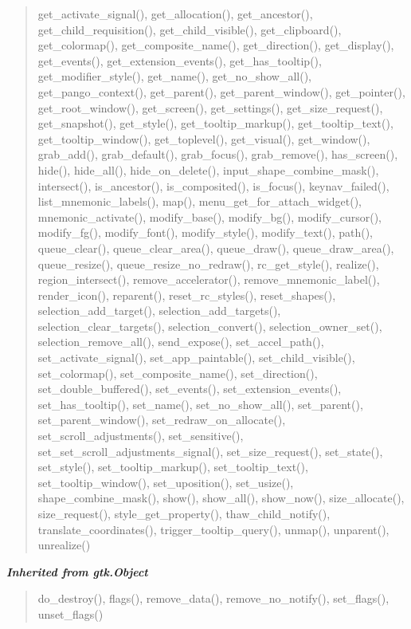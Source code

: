 \begin{quote}
get\_activate\_signal(), get\_allocation(), get\_ancestor(), get\_child\_requisition(), get\_child\_visible(), get\_clipboard(), get\_colormap(), get\_composite\_name(), get\_direction(), get\_display(), get\_events(), get\_extension\_events(), get\_has\_tooltip(), get\_modifier\_style(), get\_name(), get\_no\_show\_all(), get\_pango\_context(), get\_parent(), get\_parent\_window(), get\_pointer(), get\_root\_window(), get\_screen(), get\_settings(), get\_size\_request(), get\_snapshot(), get\_style(), get\_tooltip\_markup(), get\_tooltip\_text(), get\_tooltip\_window(), get\_toplevel(), get\_visual(), get\_window(), grab\_add(), grab\_default(), grab\_focus(), grab\_remove(), has\_screen(), hide(), hide\_all(), hide\_on\_delete(), input\_shape\_combine\_mask(), intersect(), is\_ancestor(), is\_composited(), is\_focus(), keynav\_failed(), list\_mnemonic\_labels(), map(), menu\_get\_for\_attach\_widget(), mnemonic\_activate(), modify\_base(), modify\_bg(), modify\_cursor(), modify\_fg(), modify\_font(), modify\_style(), modify\_text(), path(), queue\_clear(), queue\_clear\_area(), queue\_draw(), queue\_draw\_area(), queue\_resize(), queue\_resize\_no\_redraw(), rc\_get\_style(), realize(), region\_intersect(), remove\_accelerator(), remove\_mnemonic\_label(), render\_icon(), reparent(), reset\_rc\_styles(), reset\_shapes(), selection\_add\_target(), selection\_add\_targets(), selection\_clear\_targets(), selection\_convert(), selection\_owner\_set(), selection\_remove\_all(), send\_expose(), set\_accel\_path(), set\_activate\_signal(), set\_app\_paintable(), set\_child\_visible(), set\_colormap(), set\_composite\_name(), set\_direction(), set\_double\_buffered(), set\_events(), set\_extension\_events(), set\_has\_tooltip(), set\_name(), set\_no\_show\_all(), set\_parent(), set\_parent\_window(), set\_redraw\_on\_allocate(), set\_scroll\_adjustments(), set\_sensitive(), set\_set\_scroll\_adjustments\_signal(), set\_size\_request(), set\_state(), set\_style(), set\_tooltip\_markup(), set\_tooltip\_text(), set\_tooltip\_window(), set\_uposition(), set\_usize(), shape\_combine\_mask(), show(), show\_all(), show\_now(), size\_allocate(), size\_request(), style\_get\_property(), thaw\_child\_notify(), translate\_coordinates(), trigger\_tooltip\_query(), unmap(), unparent(), unrealize()
\end{quote}

\large{\textbf{\textit{Inherited from gtk.Object}}}

\begin{quote}
do\_destroy(), flags(), remove\_data(), remove\_no\_notify(), set\_flags(), unset\_flags()
\end{quote}

